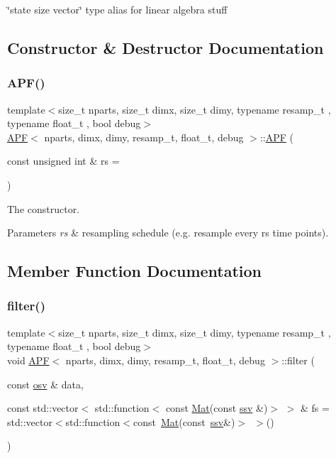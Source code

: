 \char`\"{}state size vector\char`\"{} type alias for linear algebra stuff 

\subsection{Constructor \& Destructor Documentation}
\mbox{\label{classAPF_ac91086b73cfa01568ce80bbf616c6a91}} 
\subsubsection{\texorpdfstring{A\+P\+F()}{APF()}}
{\footnotesize\ttfamily template$<$size\+\_\+t nparts, size\+\_\+t dimx, size\+\_\+t dimy, typename resamp\+\_\+t , typename float\+\_\+t , bool debug$>$ \\
\hyperlink{classAPF}{A\+PF}$<$ nparts, dimx, dimy, resamp\+\_\+t, float\+\_\+t, debug $>$\+::\hyperlink{classAPF}{A\+PF} (\begin{DoxyParamCaption}\item[{const unsigned int \&}]{rs = {} }\end{DoxyParamCaption})}



The constructor. 


\begin{DoxyParams}{Parameters}
{\em rs} & resampling schedule (e.\+g. resample every rs time points). \\
\hline
\end{DoxyParams}


\subsection{Member Function Documentation}
\mbox{\label{classAPF_a7fab332be59a652efc6a6546711d2ff9}} 
\subsubsection{\texorpdfstring{filter()}{filter()}}
{\footnotesize\ttfamily template$<$size\+\_\+t nparts, size\+\_\+t dimx, size\+\_\+t dimy, typename resamp\+\_\+t , typename float\+\_\+t , bool debug$>$ \\
void \hyperlink{classAPF}{A\+PF}$<$ nparts, dimx, dimy, resamp\+\_\+t, float\+\_\+t, debug $>$\+::filter (\begin{DoxyParamCaption}\item[{const \hyperlink{classAPF_ae4887b3f7121a7509397dd00bffedfe0}{osv} \&}]{data,  }\item[{const std\+::vector$<$ std\+::function$<$ const \hyperlink{classAPF_ac241705f732b7e0a0bc1a3bc518a92d2}{Mat}(const \hyperlink{classAPF_a8b170471292cd6fb5c3c19b55b42fc4e}{ssv} \&)$>$ $>$ \&}]{fs = {\ttfamily std\+:\+:vector$<$std\+:\+:function$<$const~\hyperlink{classAPF_ac241705f732b7e0a0bc1a3bc518a92d2}{Mat}(const~\hyperlink{classAPF_a8b170471292cd6fb5c3c19b55b42fc4e}{ssv}\&)$>$~$>$()} }\end{DoxyParamCaption})}



